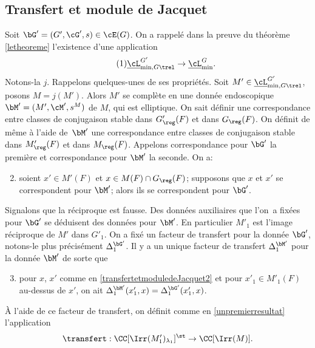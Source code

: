 \subsection{Transfert et module de Jacquet}\label{transfertetmoduledeJacquet}
Soit $\bG'=(G',\cG',s)\in \cE(G)$. On a rappelé dans la preuve du théorème \ref{letheoreme} l'existence d'une application
\begin{equation}\tag{1}\label{transfertetmoduledeJacquet1}
\underline{\cL}_{\min,G\trel}^{G'}\to\underline{\cL}_{\min}^G.
\end{equation}
Notons-la $j$. Rappelons quelques-unes de ses propriétés. Soit $M'\in
\underline{\cL}_{\min,G\trel}^{G'}$, posons
$M=j(M')$. Alors $M'$ se complète en une donnée endoscopique $\bM'=(M',\cM',s^M)$ de $M$, qui est elliptique.
On sait définir une correspondance entre classes de conjugaison stable dans $G'_{\reg}(F)$ et dans $G_{\reg}(F)$. On définit de même à l'aide de~$\bM'$ une correspondance entre classes de conjugaison stable dans $M'_{\reg}(F)$ et dans $M_{\reg}(F)$. Appelons correspondance pour $\bG'$ la première et correspondance pour $\bM'$ la seconde. On a:
\begin{enumerate}\setcounter{enumi}{1}
\item\label{transfertetmoduledeJacquet2}
soient $x'\in M'(F)$ et $x\in M(F)\cap G_{\reg}(F)$; supposons que $x$ et $x'$ se correspondent pour $\bM'$; alors ils se correspondent pour $\bG'$.
\end{enumerate}

Signalons que la réciproque est fausse.
Des données auxiliaires que l'on~a fixées pour $\bG'$ se déduisent des données pour $\bM'$. En particulier $M'_{1}$ est l'image réciproque de $M'$ dans $G'_{1}$. On a fixé un facteur de transfert pour la donnée $\bG'$, notons-le plus précisément $\Delta_{1}^{\bG'}$. Il y a un unique facteur de transfert $\Delta_{1}^{\bM'}$ pour la donnée $\bM'$ de sorte que
\begin{enumerate}\setcounter{enumi}{2}
\item\label{transfertetmoduledeJacquet3}
pour $x$, $x'$ comme en \eqref{transfertetmoduledeJacquet2} et pour $x'_{1}\in M'_{1}(F)$ au-dessus de $x'$, on ait
$\Delta_{1}^{\bM'}(x_{1}',x)=\Delta_{1}^{\bG'}(x'_{1},x)$.
\end{enumerate}

À l'aide de ce facteur de transfert, on définit comme en \ref{unpremierresultat} l'application
\[
\transfert:\CC[\Irr(M'_{1})_{\lambda_{1}}]^{\st}\to \CC[\Irr(M)].
\]

